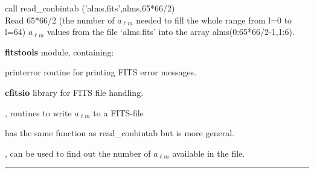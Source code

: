 \begin{example}
{
call read\_conbintab ('alms.fits',alms,65*66/2)  \\
}
{
Read 65*66/2 (the number of $a_{\ell m}$ needed to fill the whole range from l=0 to l=64)  $a_{\ell m}$  values from the file `alms.fits' into the array alms(0:65*66/2-1,1:6). 
}
\end{example}

\begin{modules}
  \begin{sulist}{} %
  \item[\textbf{fitstools}] module, containing:
  \item[printerror] routine for printing FITS error messages.
  \item[\textbf{cfitsio}] library for FITS file handling.		
  \end{sulist}
\end{modules}

\begin{related}
  \begin{sulist}{} %
  \item[\htmlref{alms2fits}{sub:alms2fits}, \htmlref{dump\_alms}{sub:dump_alms}] routines to write $a_{\ell m}$ to a FITS-file 
  \item[\htmlref{fits2alms}{sub:fits2alms}] has the same function as read\_conbintab but is more general.
  \item[\htmlref{number\_of\_alms}{sub:number_of_alms}, \htmlref{getsize\_fits}{sub:getsize_fits}]
  can be used to find out the number of $a_{\ell m}$ available in the file.
  \end{sulist}
\end{related}

\rule{\hsize}{2mm}

\newpage
